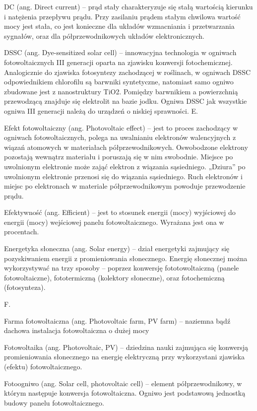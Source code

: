 \documentclass[12pt,a4paper]{article}
\begin{document}
DC (ang. Direct current) – prąd stały charakteryzuje się stałą wartością kierunku i natężenia przepływu prądu. Przy zasilaniu prądem stałym chwilowa wartość mocy jest stała, co jest konieczne dla układów wzmacniania i przetwarzania sygnałów, oraz dla półprzewodnikowych układów elektronicznych.

DSSC (ang. Dye-sensitized solar cell) – innowacyjna technologia w ogniwach fotowoltaicznych III generacji oparta na zjawisku konwersji fotochemicznej. Analogicznie do zjawiska fotosyntezy zachodzącej w roślinach, w ogniwach DSSC odpowiednikiem chlorofilu są barwniki syntetyczne, natomiast samo ogniwo zbudowane jest z nanostruktury TiO2. Pomiędzy barwnikiem a powierzchnią przewodzącą znajduje się elektrolit na bazie jodku. Ogniwa DSSC jak wszystkie ogniwa III generacji należą do urządzeń o niskiej sprawności.
E.

Efekt fotowoltaiczny (ang. Photovoltaic effect) – jest to proces zachodzący w ogniwach fotowoltaicznych, polega na uwalnianiu elektronów walencyjnych z wiązań atomowych w materiałach półprzewodnikowych. Oswobodzone elektrony pozostają wewnątrz materiału i poruszają się w nim swobodnie. Miejsce po uwolnionym elektronie może zająć elektron z wiązania sąsiedniego. „Dziura” po uwolnionym elektronie przenosi się do wiązania sąsiedniego. Ruch elektronów i miejsc po elektronach w materiale półprzewodnikowym powoduje przewodzenie prądu.

Efektywność (ang. Efficient) – jest to stosunek energii (mocy) wyjściowej do energii (mocy) wejściowej panelu fotowoltaicznego. Wyrażana jest ona w procentach.

Energetyka słoneczna (ang. Solar energy) – dział energetyki zajmujący się pozyskiwaniem energii z promieniowania słonecznego. Energię słonecznej można wykorzystywać na trzy sposoby – poprzez konwersję fototowoltaiczną (panele fotowoltaiczne), fototermiczną (kolektory słoneczne), oraz fotochemiczną (fotosynteza).

 

F.

Farma fotowoltaiczna (ang. Photovoltaic farm, PV farm) – naziemna bądź dachowa instalacja fotowoltaiczna o dużej mocy

Fotowoltaika (ang. Photovoltaic, PV) – dziedzina nauki zajmująca się konwersją promieniowania słonecznego na energię elektryczną przy wykorzystani zjawiska (efektu) fotowoltaicznego.

Fotoogniwo (ang. Solar cell, photovoltaic cell) – element półprzewodnikowy, w którym następuje konwersja fotowoltaiczna. Ogniwo jest podstawową jednostką budowy panelu fotowoltaicznego.
\end{document}

